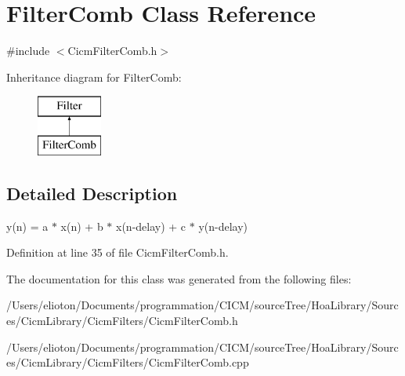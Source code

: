 \hypertarget{class_filter_comb}{\section{Filter\-Comb Class Reference}
\label{class_filter_comb}
}


{\ttfamily \#include $<$Cicm\-Filter\-Comb.\-h$>$}

Inheritance diagram for Filter\-Comb\-:\begin{figure}[H]
\begin{center}
\leavevmode
\includegraphics[height=2.000000cm]{class_filter_comb}
\end{center}
\end{figure}


\subsection{Detailed Description}
y(n) = a $\ast$ x(n) + b $\ast$ x(n-\/delay) + c $\ast$ y(n-\/delay) 

Definition at line 35 of file Cicm\-Filter\-Comb.\-h.



The documentation for this class was generated from the following files\-:\begin{DoxyCompactItemize}
\item 
/\-Users/elioton/\-Documents/programmation/\-C\-I\-C\-M/source\-Tree/\-Hoa\-Library/\-Sources/\-Cicm\-Library/\-Cicm\-Filters/Cicm\-Filter\-Comb.\-h\item 
/\-Users/elioton/\-Documents/programmation/\-C\-I\-C\-M/source\-Tree/\-Hoa\-Library/\-Sources/\-Cicm\-Library/\-Cicm\-Filters/Cicm\-Filter\-Comb.\-cpp\end{DoxyCompactItemize}
